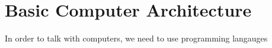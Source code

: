\documentclass[../main.tex]{subfiles}
\begin{document}
\section{Basic Computer Architecture}
In order to talk with computers, we need to use programming langauges
\end{document}
